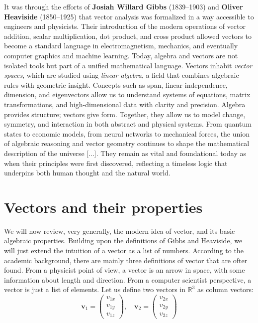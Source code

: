 \documentclass{book}
\begin{document}
It was through the efforts of \textbf{Josiah Willard Gibbs} (1839--1903) and \textbf{Oliver Heaviside} (1850--1925) that vector analysis was formalized in a way accessible to engineers and physicists. Their introduction of the modern operations of vector addition, scalar multiplication, dot product, and cross product allowed vectors to become a standard language in electromagnetism, mechanics, and eventually computer graphics and machine learning. Today, algebra and vectors are not isolated tools but part of a unified mathematical language. Vectors inhabit \emph{vector spaces}, which are studied using \emph{linear algebra}, a field that combines algebraic rules with geometric insight. Concepts such as span, linear independence, dimension, and eigenvectors allow us to understand systems of equations, matrix transformations, and high-dimensional data with clarity and precision.
Algebra provides structure; vectors give form. Together, they allow us to model change, symmetry, and interaction in both abstract and physical systems. From quantum states to economic models, from neural networks to mechanical forces, the union of algebraic reasoning and vector geometry continues to shape the mathematical description of the universe [...]. They remain as vital and foundational today as when their principles were first discovered, reflecting a timeless logic that underpins both human thought and the natural world.

\newpage

\section{Vectors and their properties}

We will now review, very generally, the modern idea of vector, and its basic algebraic properties. Building upon the definitions of Gibbs and Heaviside, we will just extend the intuition of a vector as a list of numbers. According to the academic background, there are mainly three definitions of vector that are ofter found. From a physicist point of view, a vector is an arrow in space, with some information about length and direction. From a computer scientist perspective, a vector is just a list of elements. Let us define two vectors in \( \mathbb{R}^3 \) as column vectors:
\begin{equation}
	\mathbf{v}_1 = \begin{pmatrix} v_{1x} \\ v_{1y} \\ v_{1z} \end{pmatrix}, \quad
	\mathbf{v}_2 = \begin{pmatrix} v_{2x} \\ v_{2y} \\ v_{2z} \end{pmatrix}
\end{equation}
\end{document}
